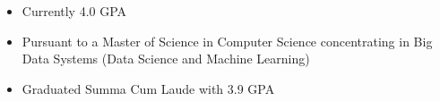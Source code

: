 \par\bigskip
{}
\begin{itemize}
  \item Currently 4.0 GPA
  \item Pursuant to a Master of Science in Computer Science concentrating in Big Data Systems (Data Science and Machine Learning)
\end{itemize}
\divider

\begin{itemize}
  \item Graduated Summa Cum Laude with 3.9 GPA
\end{itemize}

